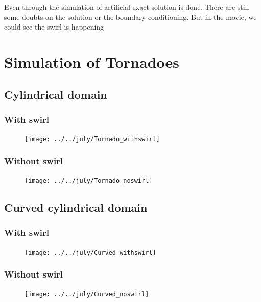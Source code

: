 \documentclass[a4paper]{article}
\begin{document}
Even through the simulation of artificial exact solution is done. There are still some doubts on the solution or the boundary conditioning. But in the movie, we could see the swirl is happening

\newpage
\section{Simulation of Tornadoes}

\subsection{Cylindrical domain}
\subsubsection{With swirl}
\begin{figure}[h!]
	\centering
	\texttt{[image: ../../july/Tornado\_withswirl]}
	\caption{}
	\label{fig:tornadowithswirl}
\end{figure}
\subsubsection{Without swirl}
\begin{figure}[h!]
	\centering
	\texttt{[image: ../../july/Tornado\_noswirl]}
	\caption{}
	\label{fig:tornadonoswirl}
\end{figure}


\subsection{Curved cylindrical domain}
\subsubsection{With swirl}
\begin{figure}[h!]
	\centering
	\texttt{[image: ../../july/Curved\_withswirl]}
	\caption{}
	\label{fig:curvedwithswirl}
\end{figure}

\subsubsection{Without swirl}
\begin{figure}[h!]
	\centering
	\texttt{[image: ../../july/Curved\_noswirl]}
	\caption{}
	\label{fig:curvednoswirl}
\end{figure}
\end{document}
